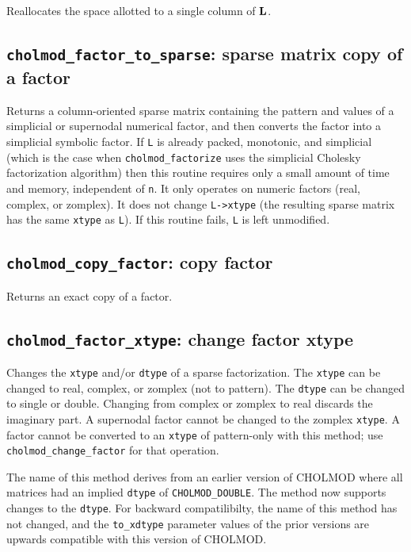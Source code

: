 \documentclass[11pt]{article}
\newcommand{\m}[1]{{\bf{#1}}}       %
\begin{document}

Reallocates the space allotted to a single column of $\m{L}$.

\subsection{{\tt cholmod\_factor\_to\_sparse}: sparse matrix copy of a factor}


Returns a column-oriented sparse matrix containing the pattern and values of a
simplicial or supernodal numerical factor, and then converts the factor into a
simplicial symbolic factor.  If {\tt L} is already packed, monotonic, and
simplicial (which is the case when {\tt cholmod\_factorize} uses the simplicial
Cholesky factorization algorithm) then this routine requires only a small
amount of time and memory, independent of {\tt n}.  It only operates on numeric
factors (real, complex, or zomplex).  It does not change {\tt L->xtype} (the
resulting sparse matrix has the same {\tt xtype} as {\tt L}).  If this routine
fails, {\tt L} is left unmodified.

\subsection{{\tt cholmod\_copy\_factor}: copy factor}


Returns an exact copy of a factor.

\subsection{{\tt cholmod\_factor\_xtype}: change factor xtype}


Changes the {\tt xtype} and/or \verb'dtype' of a sparse factorization.  The
\verb'xtype' can be changed to real, complex, or zomplex (not to pattern).
The \verb'dtype' can be changed to single or double.  Changing from complex or
zomplex to real discards the imaginary part.
A supernodal factor cannot be changed to the zomplex \verb'xtype'.
A factor cannot be converted to an \verb'xtype' of pattern-only with this method;
use \verb'cholmod_change_factor' for that operation.

The name of this method derives from an earlier version of CHOLMOD where all
matrices had an implied \verb'dtype' of \verb'CHOLMOD_DOUBLE'.  The method now
supports changes to the \verb'dtype'.  For backward compatilibilty, the name of
this method has not changed, and the \verb'to_xdtype' parameter values of the
prior versions are upwards compatible with this version of CHOLMOD.
\end{document}
